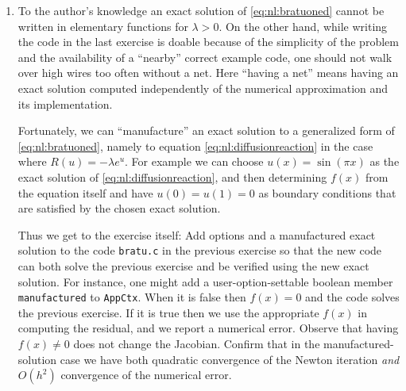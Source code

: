 \begin{enumerate}
\item To the author's knowledge an exact solution of \eqref{eq:nl:bratuoned} cannot be written in elementary functions for $\lambda>0$.  On the other hand, while writing the code in the last exercise is doable because of the simplicity of the problem and the availability of a ``nearby'' correct example code, one should not walk over high wires too often without a net.  Here ``having a net'' means having an exact solution computed independently of the numerical approximation and its implementation.

Fortunately, we can ``manufacture'' \citep{Wesseling2001} an exact solution to a generalized form of \eqref{eq:nl:bratuoned}, namely to equation \eqref{eq:nl:diffusionreaction} in the case where $R(u)=-\lambda e^u$.  For example we can choose $u(x) = \sin(\pi x)$ as the exact solution of \eqref{eq:nl:diffusionreaction}, and then determining $f(x)$ from the equation itself and have $u(0)=u(1)=0$ as boundary conditions that are satisfied by the chosen exact solution.

Thus we get to the exercise itself: Add options and a manufactured exact solution to the code \texttt{bratu.c} in the previous exercise so that the new code can both solve the previous exercise and be verified using the new exact solution.  For instance, one might add a user-option-settable boolean member \texttt{manufactured} to \texttt{AppCtx}.  When it is false then $f(x)=0$ and the code solves the previous exercise.  If it is true then we use the appropriate $f(x)$ in computing the residual, and we report a numerical error.  Observe that having $f(x)\ne 0$ does not change the Jacobian.  Confirm that in the manufactured-solution case we have both quadratic convergence of the Newton iteration \emph{and} $O(h^2)$ convergence of the numerical error.

\end{enumerate}